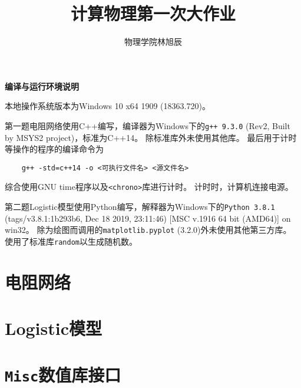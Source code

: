 \documentclass[a4paper,unicode]{report}
\title{计算物理第一次大作业}
\author{物理学院\quad 林旭辰\quad 1800011324}
\renewcommand{\appendixname}{附录}
\newcommand{\chapterendname}{章}
\renewcommand\appendix{\par
  \setcounter{chapter}{0}%
  \setcounter{section}{0}%
  \renewcommand\chaptertitlename{\appendixname}%
  \renewcommand\thechapter{\Alph{chapter}}%
  \renewcommand\chapterendname{}}
\begin{document}
\maketitle
\tableofcontents

\begin{center}
    \textbf{编译与运行环境说明}
\end{center}

本地操作系统版本为\textsf{Windows 10 x64 1909 (18363.720)}。

第一题电阻网络使用\textsf{C++}编写，编译器为Windows下的\texttt{g++ 9.3.0} (Rev2, Built by MSYS2 project)，标准为\textsf{C++14}。
除标准库外未使用其他库。
最后用于计时等操作的程序的编译命令为\begin{verbatim}
    g++ -std=c++14 -o <可执行文件名> <源文件名>
\end{verbatim}
综合使用\textsf{GNU time}程序以及\texttt{<chrono>}库进行计时。
计时时，计算机连接电源。

第二题Logistic模型使用\textsf{Python}编写，解释器为Windows下的\texttt{Python 3.8.1} (tags/v3.8.1:1b293b6, Dec 18 2019, 23:11:46) [MSC v.1916 64 bit (AMD64)] on win32。
除为绘图而调用的\texttt{matplotlib.pyplot} (3.2.0)外未使用其他第三方库。
使用了标准库\texttt{random}以生成随机数。

\chapter{电阻网络}


\chapter{Logistic模型}


\appendix

\chapter{\texttt{Misc}数值库接口}

\end{document}
